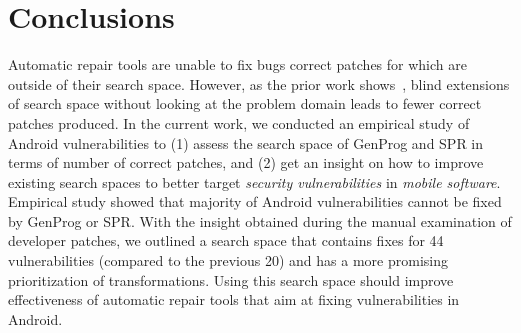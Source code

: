 \section{Conclusions}

Automatic repair tools are unable to fix bugs correct patches for which are outside of their search space. However, as the prior work shows~\cite{long2016analysis}, blind extensions of search space without looking at the problem domain leads to fewer correct patches produced. In the current work, we conducted an empirical study of \numvuln Android vulnerabilities to (1) assess the search space of GenProg and SPR in terms of number of correct patches, and (2) get an insight on how to improve existing search spaces to better target \emph{security vulnerabilities} in \emph{mobile software}. Empirical study showed that majority of Android vulnerabilities cannot be fixed by GenProg or SPR. With the insight obtained during the manual examination of developer patches, we outlined a search space that contains fixes for 44 vulnerabilities (compared to the previous 20) and has a more promising prioritization of transformations. Using this search space should improve effectiveness of automatic repair tools that aim at fixing vulnerabilities in Android.
